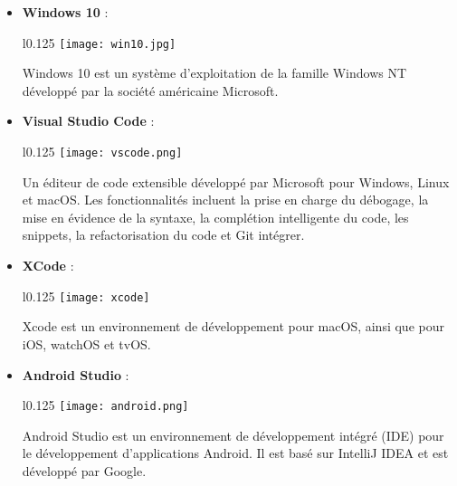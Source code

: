 \begin{itemize}
  \item \textbf{Windows 10} :\\
  \begin{minipage}{\linewidth}
    \begin{wrapfigure}{l}{0.125\textwidth}
      \vspace{-0.5cm}
      \texttt{[image: win10.jpg]} 
    \end{wrapfigure}
    Windows 10 est un système d'exploitation de la famille Windows NT développé par la société américaine Microsoft.\cite{windows10}
    \end{minipage}

    \vspace{0.5cm}

  \item \textbf{Visual Studio Code} :\\
  \begin{minipage}{\linewidth}
    \begin{wrapfigure}{l}{0.125\textwidth}
      \vspace{-0.5cm}
      \texttt{[image: vscode.png]} 
    \end{wrapfigure}
    Un éditeur de code extensible développé par Microsoft pour Windows, Linux et macOS. Les fonctionnalités incluent
     la prise en charge du débogage, la mise en évidence de la syntaxe, la complétion intelligente du code, les snippets, la refactorisation du code et Git intégrer. \cite{vscode}
  \end{minipage}
    
  \item \textbf{XCode} :\\
  \begin{minipage}{\linewidth}
    \begin{wrapfigure}{l}{0.125\textwidth}
      \vspace{-0.5cm}
      \texttt{[image: xcode]} 
    \end{wrapfigure}
    Xcode est un environnement de développement pour macOS, ainsi que pour iOS, watchOS et tvOS. \cite{xcode}
    \end{minipage}

    \vspace{0.5cm}
    \item \textbf{Android Studio} :\\
    \begin{minipage}{\linewidth}
      \begin{wrapfigure}{l}{0.125\textwidth}
        \vspace{-0.5cm}
        \texttt{[image: android.png]} 
      \end{wrapfigure}
      Android Studio est un environnement de développement intégré (IDE) pour le développement d'applications Android. Il est basé sur IntelliJ IDEA et est développé par Google. \cite{androidStudio}
    \end{minipage}


\end{itemize}
